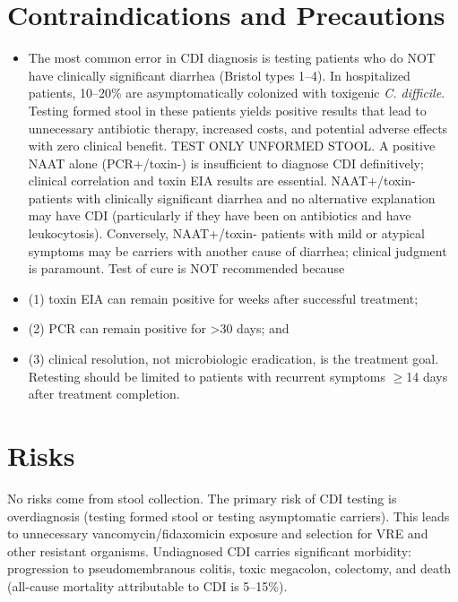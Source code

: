 \section*{Contraindications and Precautions}
\begin{itemize}
  \item The most common error in CDI diagnosis is testing patients who do NOT have clinically significant diarrhea (Bristol types 1--4). In hospitalized patients, 10--20\% are asymptomatically colonized with toxigenic \textit{C. difficile}. Testing formed stool in these patients yields positive results that lead to unnecessary antibiotic therapy, increased costs, and potential adverse effects with zero clinical benefit. TEST ONLY UNFORMED STOOL. A positive NAAT alone (PCR+/toxin-) is insufficient to diagnose CDI definitively; clinical correlation and toxin EIA results are essential. NAAT+/toxin- patients with clinically significant diarrhea and no alternative explanation may have CDI (particularly if they have been on antibiotics and have leukocytosis). Conversely, NAAT+/toxin- patients with mild or atypical symptoms may be carriers with another cause of diarrhea; clinical judgment is paramount. Test of cure is NOT recommended because
  \item (1) toxin EIA can remain positive for weeks after successful treatment;
  \item (2) PCR can remain positive for >30 days; and
  \item (3) clinical resolution, not microbiologic eradication, is the treatment goal. Retesting should be limited to patients with recurrent symptoms $\geq$14 days after treatment completion.
\end{itemize}
\section*{Risks}
No risks come from stool collection. The primary risk of CDI testing is overdiagnosis (testing formed stool or testing asymptomatic carriers). This leads to unnecessary vancomycin/fidaxomicin exposure and selection for VRE and other resistant organisms. Undiagnosed CDI carries significant morbidity: progression to pseudomembranous colitis, toxic megacolon, colectomy, and death (all-cause mortality attributable to CDI is 5--15\%).

